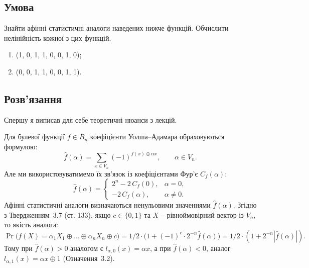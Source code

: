 \chapter{}
\label{chap:1}

\section{Умова}
Знайти афінні статистичні аналоги наведених нижче функцій. Обчислити нелінійність кожної з цих функцій.
\begin{enumerate}[label=\alph*)]
    \item (1, 0, 1, 1, 0, 0, 1, 0);
    \item (0, 0, 1, 1, 0, 0, 1, 1).
\end{enumerate}

\section{Розв'язання}

Спершу я виписав для себе теоретичні нюанси з лекцій.

\noindent Для булевої функції $f \in B_n$ коефіцієнти Уолша--Адамара обраховуються формулою:
\begin{equation*}
    \hat{f}(\alpha) = \sum\limits_{x \in V_n} (-1)^{f(x) \oplus \alpha x}, \qquad \alpha \in V_n.
\end{equation*}
Але ми використовуватимемо їх зв'язок із коефіцієнтами Фур'є $C_f(\alpha)$:
\begin{equation}
    \label{eq:AdamarCoef}
    \hat{f}(\alpha) = \begin{cases}
        2^n - 2\,C_f(0), & \alpha = 0,    \\
        -2\,C_f(\alpha), & \alpha \neq 0.
    \end{cases}
\end{equation}
Афінні статистичні аналоги визначаються ненульовими значеннями $\hat{f}(\alpha)$. Згідно з Твердженням~3.7
(ст. 133), якщо $c \in \{0,1\}$ та $X$ -- рівноймовірний вектор із $V_n$, то якість аналога:
\begin{equation}
    \label{eq:probability}
    \Pr\big(f(X) = \alpha_1 X_1 \oplus \ldots \oplus \alpha_n X_n \oplus c\big)
    = 1/2 \cdot \big(1 + (-1)^c \cdot 2^{-n}\hat{f}(\alpha)\big) = 1/2 \cdot (1 + 2^{-n}|\hat{f}(\alpha)|).
\end{equation}
Тому при $\hat{f}(\alpha) > 0$ аналогом є $l_{\alpha,0}(x) = \alpha x$, а при $\hat{f}(\alpha) < 0$, аналог
$l_{\alpha,1}(x) = \alpha x \oplus 1$ (Означення~3.2).

